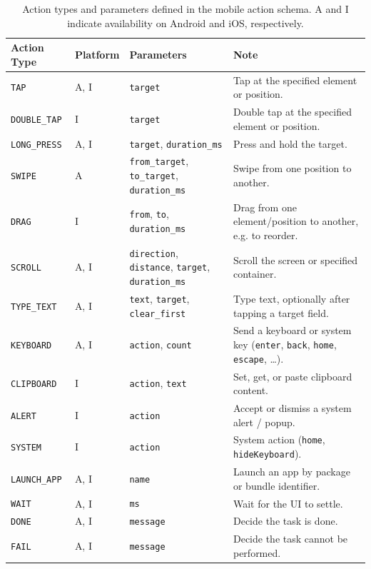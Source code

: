 \begin{table}[ht]
\centering
\caption{Action types and parameters defined in the mobile action schema. A and I indicate availability on Android and iOS, respectively.}
\label{tab:osomni_mobile_actions}
\small
\setlength{\tabcolsep}{5pt}
\renewcommand{\arraystretch}{1.12}
\begin{tabular}{p{2.4cm}p{1.6cm}p{4.4cm}p{4.6cm}}
\toprule
Action Type & Platform & Parameters & Note \\
\midrule
\texttt{TAP}          & A, I & \texttt{target}                                  & Tap at the specified element or position. \\
\texttt{DOUBLE\_TAP}  & I    & \texttt{target}                                  & Double tap at the specified element or position. \\
\texttt{LONG\_PRESS}  & A, I & \texttt{target}, \texttt{duration\_ms}           & Press and hold the target. \\
\texttt{SWIPE}        & A    & \texttt{from\_target}, \texttt{to\_target}, \texttt{duration\_ms} & Swipe from one position to another. \\
\texttt{DRAG}         & I    & \texttt{from}, \texttt{to}, \texttt{duration\_ms} & Drag from one element/position to another, e.g. to reorder. \\
\texttt{SCROLL}       & A, I & \texttt{direction}, \texttt{distance}, \texttt{target}, \texttt{duration\_ms} & Scroll the screen or specified container. \\
\texttt{TYPE\_TEXT}   & A, I & \texttt{text}, \texttt{target}, \texttt{clear\_first} & Type text, optionally after tapping a target field. \\
\texttt{KEYBOARD}     & A, I & \texttt{action}, \texttt{count}                  & Send a keyboard or system key (\texttt{enter}, \texttt{back}, \texttt{home}, \texttt{escape}, \dots). \\
\texttt{CLIPBOARD}    & I    & \texttt{action}, \texttt{text}                   & Set, get, or paste clipboard content. \\
\texttt{ALERT}        & I    & \texttt{action}                                  & Accept or dismiss a system alert / popup. \\
\texttt{SYSTEM}       & I    & \texttt{action}                                  & System action (\texttt{home}, \texttt{hideKeyboard}). \\
\texttt{LAUNCH\_APP}  & A, I & \texttt{name}                                    & Launch an app by package or bundle identifier. \\
\texttt{WAIT}         & A, I & \texttt{ms}                                      & Wait for the UI to settle. \\
\texttt{DONE}         & A, I & \texttt{message}                                 & Decide the task is done. \\
\texttt{FAIL}         & A, I & \texttt{message}                                 & Decide the task cannot be performed. \\
\bottomrule
\end{tabular}
\end{table}


